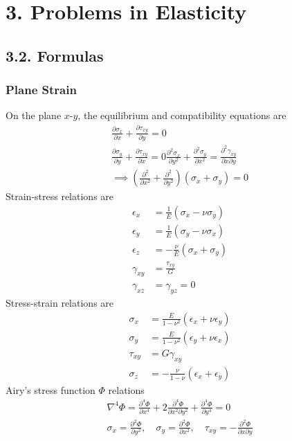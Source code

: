 \section*{3. Problems in Elasticity}
\subsection*{3.2. Formulas}
\subsubsection*{Plane Strain}
On the plane $x$-$y$, the equilibrium and compatibility equations are
\begin{gather*}
    \frac{\partial \sigma_x}{\partial x} + \frac{\partial \tau_{xy}}{\partial y} = 0 \\
    \frac{\partial \sigma_y}{\partial y} + \frac{\partial \tau_{xy}}{\partial x} = 0
    \frac{\partial^2 \sigma_x}{\partial y^2} + \frac{\partial^2 \sigma_y}{\partial x^2} = \frac{\partial^2 \gamma_{xy}}{\partial x \partial y} \\
    \implies \left(\frac{\partial^2}{\partial x^2} + \frac{\partial^2}{\partial y^2}\right) (\sigma_x + \sigma_y) = 0
\end{gather*}
Strain-stress relations are
\begin{align*}
    \epsilon_x &= \frac{1}{E} \left( \sigma_x - \nu \sigma_y \right) \\
    \epsilon_y &= \frac{1}{E} \left( \sigma_y - \nu \sigma_x \right) \\
    \epsilon_z &= -\frac{\nu}{E} \left( \sigma_x + \sigma_y \right) \\
    \gamma_{xy} &= \frac{\tau_{xy}}{G} \\
    \gamma_{xz} &= \gamma_{yz} = 0 
\end{align*}
Stress-strain relations are
\begin{align*}
    \sigma_x &= \frac{E}{1-\nu^2} \left( \epsilon_x + \nu \epsilon_y \right) \\
    \sigma_y &= \frac{E}{1-\nu^2} \left( \epsilon_y + \nu \epsilon_x \right) \\
    \tau_{xy} &= G \gamma_{xy} \\
    \sigma_z &= -\frac{\nu}{1-\nu} \left( \epsilon_x + \epsilon_y \right)
\end{align*}
Airy's stress function $\Phi$ relations
\begin{gather*}
    \nabla^4 \Phi = \frac{\partial^4 \Phi}{\partial x^4} + 2 \frac{\partial^4 \Phi}{\partial x^2 \partial y^2} + \frac{\partial^4 \Phi}{\partial y^4} = 0\\
    \sigma_x = \frac{\partial^2 \Phi}{\partial y^2}, \quad \sigma_y = \frac{\partial^2 \Phi}{\partial x^2}, \quad \tau_{xy} = -\frac{\partial^2 \Phi}{\partial x \partial y}
\end{gather*}
